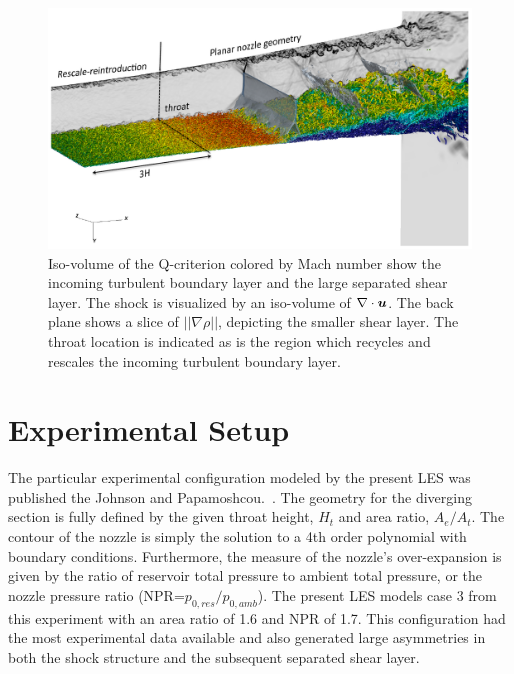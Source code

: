 \documentclass[]{aiaa-tc}%
\def\bgk#1{\mbox{\boldmath $#1$}}
\def\vec#1{\bgk{ #1}}
\begin{document}






\begin{figure}[!htb]%
	\centering
  	\includegraphics[trim = 0in 1.2in 0in 0in, clip, width = 7in]{figs/info_slide2.pdf}
	\caption{Iso-volume of the Q-criterion colored by Mach number show the incoming turbulent boundary layer and the large separated shear layer.  The shock is visualized by an iso-volume of $\nabla\cdot\vec{u}$.  The back plane shows a slice of $||\nabla\rho||$, depicting the smaller shear layer.  The throat location is indicated as is the region which recycles and rescales the incoming turbulent boundary layer.}
 	\label{fig:info_3d}
\end{figure}


\clearpage
\section{Experimental Setup}


The particular experimental configuration modeled by the present LES was published the Johnson and Papamoshcou.~\cite{Papam:10}.  The geometry for the diverging section is fully defined by the given throat height, $H_t$ and area ratio, $A_e/A_t$.  The contour of the nozzle is simply the solution to a 4th order polynomial with boundary conditions.  Furthermore, the measure of the nozzle's over-expansion is given by the ratio of reservoir total pressure to ambient total pressure, or the nozzle pressure ratio (NPR=$p_{0,res}/p_{0,amb}$).  The present LES models case 3 from this experiment with an area ratio of 1.6 and NPR of 1.7.  This configuration had the most experimental data available and also generated large asymmetries in both the shock structure and the subsequent separated shear layer.  
\end{document}
